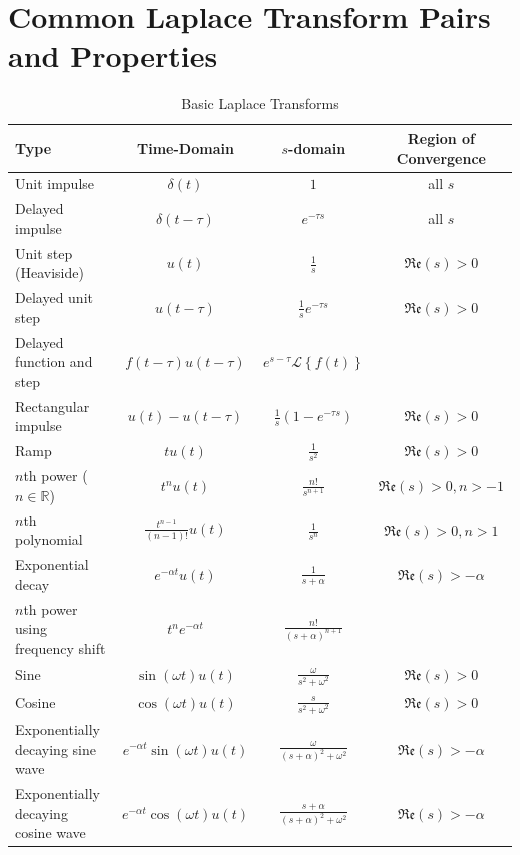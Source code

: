 \documentclass{article}
\begin{document}
\section{Common Laplace Transform Pairs and Properties}
\begin{table}[H]
    \centering
    \caption{Basic Laplace Transforms}
    \label{tab:a4-t1}
    \begin{tabular}{l|c|c|c}
        Type & Time-Domain & $s$-domain & Region of Convergence \\
        \hline
        \hline
        Unit impulse & $\delta (t)$ & $1$ & all $s$ \\
        Delayed impulse & $\delta (t-\tau )$ & $e^{-\tau s}$ & all $s$ \\
        Unit step (Heaviside) & $u(t)$ & $\frac{1}{s}$ & $\mathfrak{Re}(s)>0$ \\
        Delayed unit step & $u(t-\tau )$ & $\frac{1}{s}e^{-\tau s}$ & $\mathfrak{Re}(s)>0$ \\
        Delayed function and step & $f(t-\tau )u(t-\tau )$ & $e^{s-\tau }\mathcal{L}\left\{ f(t) \right\}$ & \\
        Rectangular impulse & $u(t)-u(t-\tau )$ & $\frac{1}{s}\left( 1-e^{-\tau s} \right)$ & $\mathfrak{Re}(s)>0$ \\
        Ramp & $tu(t)$ & $\frac{1}{s^2}$ & $\mathfrak{Re}(s)>0$ \\
        $n$th power ($n\in \mathbb{R}$) & $t^nu(t)$ & $\frac{n!}{s^{n+1}}$ & $\mathfrak{Re}(s)>0, n>-1$ \\
        $n$th polynomial & $\frac{t^{n-1}}{(n-1)!}u(t)$ & $\frac{1}{s^n}$ & $\mathfrak{Re}(s)>0, n>1$ \\
        Exponential decay & $e^{-\alpha t}u(t)$ & $\frac{1}{s+\alpha }$ & $\mathfrak{Re}(s)>-\alpha $ \\
        $n$th power using frequency shift & $t^ne^{-\alpha t}$ & $\frac{n!}{(s+\alpha )^{n+1}}$ \\
        Sine & $\sin(\omega t)u(t)$ & $\frac{\omega }{s^2+\omega^2}$ & $\mathfrak{Re}(s)>0$ \\
        Cosine & $\cos(\omega t)u(t)$ & $\frac{s}{s^2+\omega^2}$ & $\mathfrak{Re}(s)>0$\\
        Exponentially decaying sine wave & $e^{-\alpha t}\sin(\omega t)u(t)$ & $\frac{\omega }{(s+\alpha )^2+\omega^2}$ & $\mathfrak{Re}(s)>-\alpha $\\
        Exponentially decaying cosine wave & $e^{-\alpha t}\cos(\omega t)u(t)$ & $\frac{s+\alpha }{(s+\alpha )^2+\omega^2}$ & $\mathfrak{Re}(s)>-\alpha $ 
    \end{tabular}
\end{table}
\end{document}
